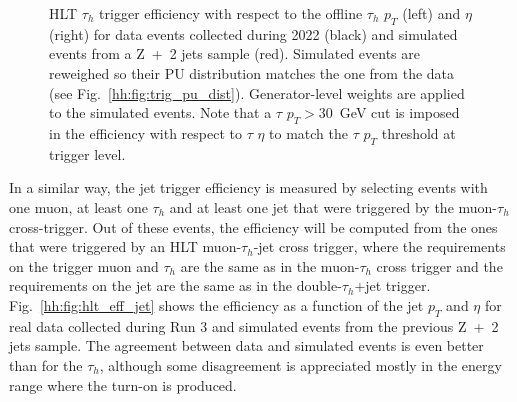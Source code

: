 \documentclass[../main.tex]{subfiles}
\begin{document}
\begin{figure}[h!]
\begin{center}
\end{center}
\caption[HLT $\tau_h$ trigger efficiency]{HLT $\tau_h$ trigger efficiency with respect to the offline $\tau_h$ $p_T$ (left) and $\eta$ (right) for data events collected during 2022 (black) and simulated events from a Z~+~2 jets sample (red). Simulated events are reweighed so their PU distribution matches the one from the data (see Fig.~\ref{hh:fig:trig_pu_dist}). Generator-level weights are applied to the simulated events.  Note that a $\tau$ $p_T>30$~GeV cut is imposed in the efficiency with respect to $\tau$ $\eta$ to match the $\tau$ $p_T$ threshold at trigger level.}
\label{hh:fig:hlt_eff_tau}
\end{figure}

In a similar way, the jet trigger efficiency is measured by selecting events with one muon, at least one $\tau_h$ and at least one jet that were triggered by the muon-$\tau_h$ cross-trigger. Out of these events, the efficiency will be computed from the ones that were triggered by an HLT muon-$\tau_h$-jet cross trigger, where the requirements on the trigger muon and $\tau_h$ are the same as in the muon-$\tau_h$ cross trigger and the requirements on the jet are the same as in the double-$\tau_h$+jet trigger. Fig.~\ref{hh:fig:hlt_eff_jet} shows the efficiency as a function of the jet $p_T$ and $\eta$ for real data collected during Run 3 and simulated events from the previous Z~+~2 jets sample. The agreement between data and simulated events is even better than for the $\tau_h$, although some disagreement is appreciated mostly in the energy range where the turn-on is produced.
\end{document}

